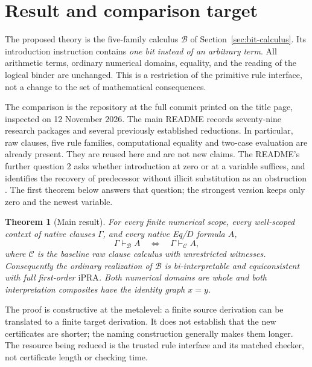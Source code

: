 \documentclass[11pt,letterpaper]{article}
\newtheorem{theorem}{Theorem}[section]
\theoremstyle{definition}
\theoremstyle{remark}
\newcommand{\IPRA}{\mathrm{iPRA}}
\newcommand{\BC}{\mathcal B}
\newcommand{\CC}{\mathcal C}
\begin{document}
\hypersetup{pageanchor=true}
\tableofcontents
\clearpage
{}

\section{Result and comparison target}

The proposed theory is the five-family calculus $\BC$ of
Section~\ref{sec:bit-calculus}. Its introduction instruction contains
\emph{one bit instead of an arbitrary term}. All arithmetic terms,
ordinary numerical domains, equality, and the reading of the logical
binder are unchanged. This is a restriction of the primitive rule
interface, not a change to the set of mathematical consequences.

The comparison is the repository at the full commit printed on the title
page, inspected on 12 November 2026. The main README records seventy-nine
research packages and several previously established reductions. In
particular, raw clauses, five rule families, computational equality and
two-case evaluation are already present. They are reused here and are
not new claims. The README's further question 2 asks whether introduction
at zero or at a variable suffices, and identifies the recovery of
predecessor without illicit substitution as an obstruction
\cite{baseline,readme}. The first theorem below answers that question;
the strongest version keeps only zero and the newest variable.

\begin{theorem}[Main result]
\label{thm:main}
For every finite numerical scope, every well-scoped context of native
clauses $\Gamma$, and every native Eq/$D$ formula $A$,
\[
 \Gamma\vdash_{\BC} A
 \quad\Longleftrightarrow\quad
 \Gamma\vdash_{\CC} A,
\]
where $\CC$ is the baseline raw clause calculus with unrestricted
witnesses. Consequently the ordinary realization of $\BC$ is
bi-interpretable and equiconsistent with full first-order $\IPRA$.
Both numerical domains are whole and both interpretation composites
have the identity graph $x=y$.
\end{theorem}

The proof is constructive at the metalevel: a finite source derivation
can be translated to a finite target derivation. It does not establish
that the new certificates are shorter; the naming construction generally
makes them longer. The resource being reduced is the trusted rule
interface and its matched checker, not certificate length or checking time.
\end{document}
